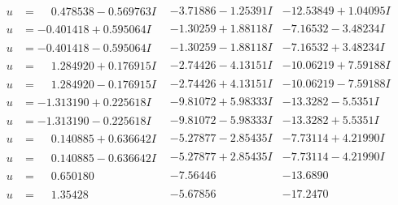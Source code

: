 \documentclass[1p]{elsarticle_modified}
\theoremstyle{definition}
\begin{document}
$$\begin{array}{c|c|c}
\begin{aligned}
u &= \phantom{-}0.478538 - 0.569763 I\end{aligned}
 & -3.71886 - 1.25391 I & -12.53849 + 1.04095 I \\ \hline\begin{aligned}
u &= -0.401418 + 0.595064 I\end{aligned}
 & -1.30259 + 1.88118 I & -7.16532 - 3.48234 I \\ \hline\begin{aligned}
u &= -0.401418 - 0.595064 I\end{aligned}
 & -1.30259 - 1.88118 I & -7.16532 + 3.48234 I \\ \hline\begin{aligned}
u &= \phantom{-}1.284920 + 0.176915 I\end{aligned}
 & -2.74426 - 4.13151 I & -10.06219 + 7.59188 I \\ \hline\begin{aligned}
u &= \phantom{-}1.284920 - 0.176915 I\end{aligned}
 & -2.74426 + 4.13151 I & -10.06219 - 7.59188 I \\ \hline\begin{aligned}
u &= -1.313190 + 0.225618 I\end{aligned}
 & -9.81072 + 5.98333 I & -13.3282 - 5.5351 I \\ \hline\begin{aligned}
u &= -1.313190 - 0.225618 I\end{aligned}
 & -9.81072 - 5.98333 I & -13.3282 + 5.5351 I \\ \hline\begin{aligned}
u &= \phantom{-}0.140885 + 0.636642 I\end{aligned}
 & -5.27877 - 2.85435 I & -7.73114 + 4.21990 I \\ \hline\begin{aligned}
u &= \phantom{-}0.140885 - 0.636642 I\end{aligned}
 & -5.27877 + 2.85435 I & -7.73114 - 4.21990 I \\ \hline\begin{aligned}
u &= \phantom{-}0.650180\phantom{ +0.000000I}\end{aligned}
 & -7.56446\phantom{ +0.000000I} & -13.6890\phantom{ +0.000000I} \\ \hline\begin{aligned}
u &= \phantom{-}1.35428\phantom{ +0.000000I}\end{aligned}
 & -5.67856\phantom{ +0.000000I} & -17.2470\phantom{ +0.000000I} \\ \hline\begin{aligned}

\end{aligned}
\end{array}$$
\end{document}
